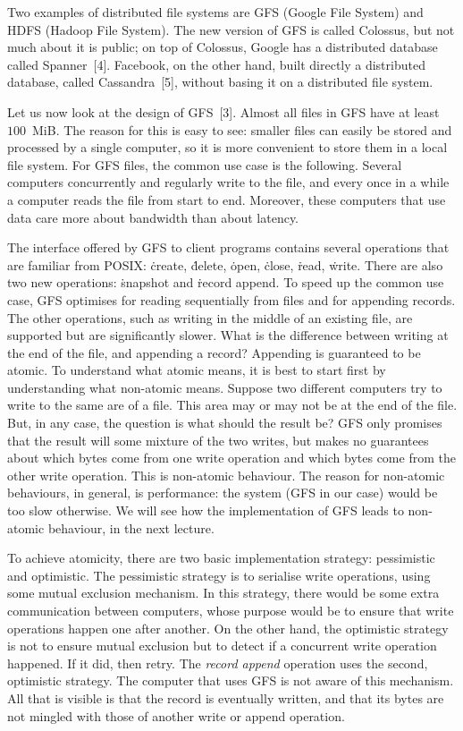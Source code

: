 Two examples of distributed file systems are
  GFS (Google File System)
  and HDFS (Hadoop File System).
The new version of GFS is called Colossus,
  but not much about it is public;
  on top of Colossus, Google has a distributed database called Spanner~[4].
Facebook, on the other hand,
  built directly a distributed database, called Cassandra~[5],
    without basing it on a distributed file system.

\smallskip

Let us now look at the design of GFS~[3].
Almost all files in GFS have at least $100$~MiB\null.
The reason for this is easy to see:
  smaller files can easily be stored and processed by a single computer,
  so it is more convenient to store them in a local file system.
For GFS files, the common use case is the following.
Several computers concurrently and regularly write to the file,
  and every once in a while a computer reads the file from start to end.
Moreover,
  these computers that use data care more about bandwidth than about latency.

\smallskip

The interface offered by GFS to client programs contains several operations
  that are familiar from POSIX:
  \.{create}, \.{delete}, \.{open}, \.{close}, \.{read}, \.{write}.
There are also two new operations:
  \.{snapshot} and \.{record append}.
To speed up the common use case,
  GFS optimises for reading sequentially from files and for appending records.
The other operations, such as writing in the middle of an existing file,
  are supported but are significantly slower.
What is the difference between writing at the end of the file,
  and appending a record?
Appending is guaranteed to be atomic.
To understand what atomic means,
  it is best to start first by understanding what non-atomic means.
Suppose two different computers try to write to the same are of a file.
This area may or may not be at the end of the file.
But, in any case, the question is what should the result be?
GFS only promises that the result will some mixture of the two writes,
  but makes no guarantees
    about which bytes come from one write operation
    and which bytes come from the other write operation.
This is non-atomic behaviour.
The reason for non-atomic behaviours, in general, is performance:
  the system (GFS in our case) would be too slow otherwise.
We will see how the implementation of GFS leads to non-atomic behaviour,
  in the next lecture.

To achieve atomicity, there are two basic implementation strategy:
  pessimistic and optimistic.
The pessimistic strategy is to serialise write operations,
  using some mutual exclusion mechanism.
In this strategy, there would be some extra communication between computers,
  whose purpose would be to ensure that write operations happen one after another.
On the other hand,
  the optimistic strategy is not to ensure mutual exclusion
    but to detect if a concurrent write operation happened.
If it did, then retry.
The \emph{record append} operation uses the second, optimistic strategy.
The computer that uses GFS is not aware of this mechanism.
All that is visible is that the record is eventually written,
  and that its bytes are not mingled with those of another write or append operation.

